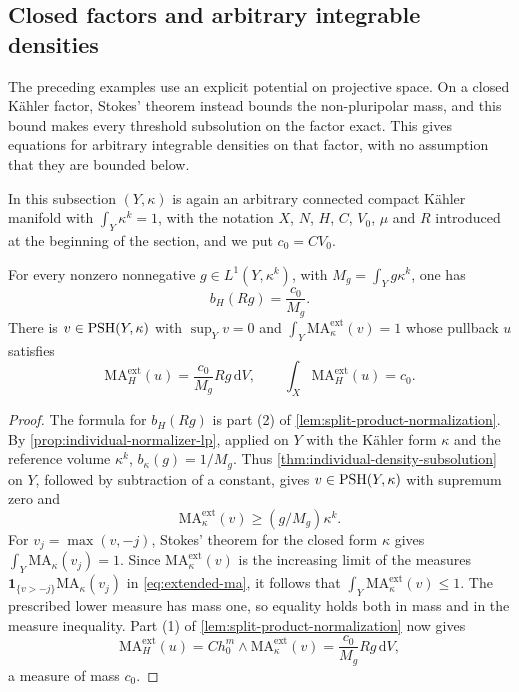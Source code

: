 \subsection{Closed factors and arbitrary integrable densities}
\label{subsec:closed-factor-equations}

The preceding examples use an explicit potential on projective space. On a closed K\"ahler factor, Stokes' theorem instead bounds the non-pluripolar mass, and this bound makes every threshold subsolution on the factor exact. This gives equations for arbitrary integrable densities on that factor, with no assumption that they are bounded below.

In this subsection $(Y,\kappa)$ is again an arbitrary connected compact K\"ahler manifold with $\int_Y\kappa^k=1$, with the notation $X$, $N$, $H$, $C$, $V_0$, $\mu$ and $R$ introduced at the beginning of the section, and we put $c_0=CV_0$.

\begin{theorem}\label{thm:closed-factor-integrable-equation}
For every nonzero nonnegative $g\in L^1(Y,\kappa^k)$, with $M_g=\int_Yg\kappa^k$, one has
\[
 b_H(Rg)=\frac{c_0}{M_g}.
\]
There is $v\in\mathrm{PSH}(Y,\kappa)$ with $\sup_Yv=0$ and $\int_Y\mathrm{MA}^{\mathrm{ext}}_\kappa(v)=1$ whose pullback $u$ satisfies
\[
 \mathrm{MA}^{\mathrm{ext}}_H(u)
       =\frac{c_0}{M_g}Rg\,\mathrm dV,\qquad
 \int_X\mathrm{MA}^{\mathrm{ext}}_H(u)=c_0.
\]
\end{theorem}
\begin{proof}
The formula for $b_H(Rg)$ is part (2) of \cref{lem:split-product-normalization}. By \cref{prop:individual-normalizer-lp}, applied on $Y$ with the K\"ahler form $\kappa$ and the reference volume $\kappa^k$, $b_\kappa(g)=1/M_g$. Thus \cref{thm:individual-density-subsolution} on $Y$, followed by subtraction of a constant, gives $v\in\mathrm{PSH}(Y,\kappa)$ with supremum zero and
\[
 \mathrm{MA}^{\mathrm{ext}}_\kappa(v)\geq(g/M_g)\kappa^k.
\]
For $v_j=\max(v,-j)$, Stokes' theorem for the closed form $\kappa$ gives $\int_Y\mathrm{MA}_\kappa(v_j)=1$. Since $\mathrm{MA}^{\mathrm{ext}}_\kappa(v)$ is the increasing limit of the measures $\mathbf1_{\{v>-j\}}\mathrm{MA}_\kappa(v_j)$ in \eqref{eq:extended-ma}, it follows that $\int_Y\mathrm{MA}^{\mathrm{ext}}_\kappa(v)\leq1$. The prescribed lower measure has mass one, so equality holds both in mass and in the measure inequality. Part (1) of \cref{lem:split-product-normalization} now gives
\[
 \mathrm{MA}^{\mathrm{ext}}_H(u)
   =C h_0^m\wedge\mathrm{MA}^{\mathrm{ext}}_\kappa(v)
   =\frac{c_0}{M_g}Rg\,\mathrm dV,
\]
a measure of mass $c_0$.
\end{proof}

